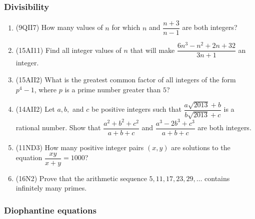 \documentclass[10pt,paper=letter]{scrartcl}
\begin{document}
\subsubsection*{Divisibility}

\begin{enumerate}

\item (9QII7) How many values of $n$ for which $n$ and $\dfrac{n+3}{n-1}$ are both integers?

\item (15AI11) Find all integer values of $n$ that will make $\dfrac{6n^3-n^2+2n+32}{3n+1}$ an integer.

\item (15AII2) What is the greatest common factor of all integers of the form $p^4 - 1$, where $p$ is a prime number greater than $5$?

\item (14AII2) Let $a, b,$ and $c$ be positive integers such that $\dfrac{a\sqrt{2013} + b}{b\sqrt{2013} + c}$ is a rational number. Show that $\dfrac{a^2+b^2+c^2}{a+b+c}$ and $\dfrac{a^3 - 2b^3 + c^3}{a+b+c}$ are both integers.

\item (11ND3) How many positive integer pairs $(x, y)$ are solutions to the equation $\dfrac{xy}{x+y}=1000$?

\item (16N2) Prove that the arithmetic sequence $5, 11, 17, 23, 29, \ldots$ contains infinitely many primes.

\end{enumerate}

\subsubsection*{Diophantine equations}
\end{document}
